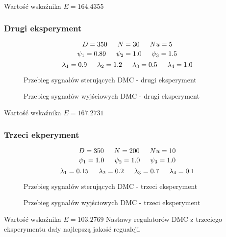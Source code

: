 Wartość wskaźnika $E=\num{164.4355}$

\newpage
\subsubsection{Drugi eksperyment}

$$D=350 \indent  N=30 \indent  Nu=5$$ 
$$\psi_1=\num{0.89} \indent \psi_2=\num{1.0} \indent \psi_3=\num{1.5}$$
$$\lambda_1=\num{0.9} \indent \lambda_2=\num{1.2} \indent \lambda_3=\num{0.5} \indent \lambda_4=\num{1.0}$$


\ifdefined\CompileFigures
    \begin{figure}[H] 
        \centering
        
        \caption{Przebieg sygnałów sterujących DMC - drugi eksperyment}
        \label{projekt:zad4:figure:projzadanie4DMC2u}
\end{figure}
\fi

\ifdefined\CompileFigures
    \begin{figure}[H] 
        \centering
        
        \caption{Przebieg sygnałów wyjściowych DMC - drugi eksperyment}
        \label{projekt:zad4:figure:projzadanie4DMC2y}
    \end{figure}
\fi

Wartość wskaźnika $E=\num{167.2731}$

\newpage
\subsubsection{Trzeci ekperyment}

$$D=350 \indent  N=200 \indent  Nu=10$$ 
$$\psi_1=\num{1.0} \indent \psi_2=\num{1.0} \indent \psi_3=\num{1.0}$$
$$\lambda_1=\num{0.15} \indent \lambda_2=\num{0.2} \indent \lambda_3=\num{0.7} \indent \lambda_4=\num{0.1}$$


\ifdefined\CompileFigures
    \begin{figure}[H] 
        \centering
        
        \caption{Przebieg sygnałów sterujących DMC - trzeci eksperyment}
        \label{projekt:zad4:figure:projzadanie4DMCBESTu}
    \end{figure}
\fi

\ifdefined\CompileFigures
    \begin{figure}[H] 
        \centering
        
        \caption{Przebieg sygnałów wyjściowych DMC - trzeci eksperyment}
        \label{projekt:zad4:figure:projzadanie4DMCBESTy}
    \end{figure}
\fi

Wartość wskaźnika $E=\num{103.2769}$
\newline
Nastawy regulatorów DMC z trzeciego eksperymentu dały najlepszą jakość regualcji.

\newpage
